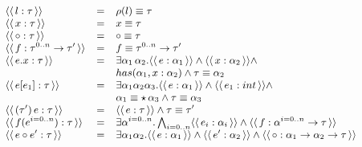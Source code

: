 \documentclass[a4paper,8pt]{article}
\newcommand{\constr}[1]{\ensuremath{\langle\langle\,#1\,\rangle\rangle}}
\begin{document}
     \begin{figure}[h]
       \[\small{
            \begin{array}{lcl}
                \constr{l : \tau} & = & \rho(l) \equiv \tau\\
                \constr{x : \tau} & = & x \equiv \tau \\
                \constr{\circ : \tau} & = & \circ \equiv \tau \\
                \constr{f : \tau^{0..n}\to \tau'} & = & f \equiv
                                                        \tau^{0..n}\to
                                                        \tau' \\
                \constr{e.x : \tau} & = & \exists
                                          \alpha_1\,\alpha_2. \constr{e
                                          : \alpha_1} \land \constr{x
                                          : \alpha_2} \land \\
                          & & has(\alpha_1,x:\alpha_2) \land \tau
                              \equiv \alpha_2\\
                \constr{e[e_1] : \tau} & = & \exists
                                         \alpha_1\alpha_2\alpha_3. \constr{e:\alpha_1}
                                             \land\constr{e_1: int}\land\\
                         & & \alpha_1\equiv\star\,\alpha_3 \land \tau
                             \equiv\alpha_3\\
                \constr{(\tau')\,e:\tau} & = & \constr{e : \tau} \land
                                               \tau \equiv \tau'\\
                \constr{f(e^{i=0..n}) : \tau} & = & \exists
                                                    \alpha^{i=0..n}. \bigwedge_{i=0..n}\constr{e_i:\alpha_i}
                                                    \land \constr{f :
                                                    \alpha^{i=0..n}
                                                    \to \tau} \\
                     \constr{e \circ e' : \tau} & = & \exists
                                                      \alpha_1\alpha_2.\constr{e
                                                      :\alpha_1} \land
                                                      \constr{e' :
                                                      \alpha_2} \land
                                                      \constr{\circ :
                                                      \alpha_1\to\alpha_2\to\tau}\\

\end{array}}\]
\end{figure}
\end{document}
